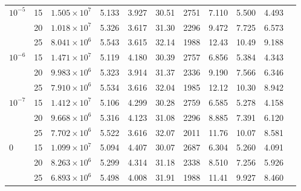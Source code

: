 {\begin{table}[h!]
{\begin{tabular}{lcccccccccc}
        $10^{-5}$   & 15 & $1.505 \times 10^7$  & 5.133 & 3.927 & 30.51 & 2751 & 7.110 & 5.500 & 4.493  \\
                    & 20 & $1.018 \times 10^7$  & 5.326 & 3.617 & 31.30 & 2296 & 9.472 & 7.725 & 6.573  \\
                    & 25 & $8.041 \times 10^6$  & 5.543 & 3.615 & 32.14 & 1988 & 12.43 & 10.49 & 9.188  \\
        $10^{-6}$   & 15 & $1.471 \times 10^7$  & 5.119 & 4.180 & 30.39 & 2757 & 6.856 & 5.384 & 4.343  \\
                    & 20 & $9.983 \times 10^6$  & 5.323 & 3.914 & 31.37 & 2336 & 9.190 & 7.566 & 6.346  \\
                    & 25 & $7.910 \times 10^6$  & 5.534 & 3.616 & 32.04 & 1985 & 12.12 & 10.30 & 8.942  \\
        $10^{-7}$   & 15 & $1.412 \times 10^7$  & 5.106 & 4.299 & 30.28 & 2759 & 6.585 & 5.278 & 4.158  \\
                    & 20 & $9.668 \times 10^6$  & 5.316 & 4.123 & 31.08 & 2296 & 8.885 & 7.391 & 6.120  \\
                    & 25 & $7.702 \times 10^6$  & 5.522 & 3.616 & 32.07 & 2011 & 11.76 & 10.07 & 8.581  \\
        $0$         & 15 & $1.099 \times 10^7$  & 5.094 & 4.407 & 30.07 & 2687 & 6.304 & 5.260 & 4.091  \\
                    & 20 & $8.263 \times 10^6$  & 5.299 & 4.314 & 31.18 & 2338 & 8.510 & 7.256 & 5.926  \\
                    & 25 & $6.893 \times 10^6$  & 5.498 & 4.008 & 31.91 & 1988 & 11.41 & 9.927 & 8.460  \\
        \bottomrule    
        \end{tabular}}
    \label{tab:HeIEVMZ}
\end{table}
}

